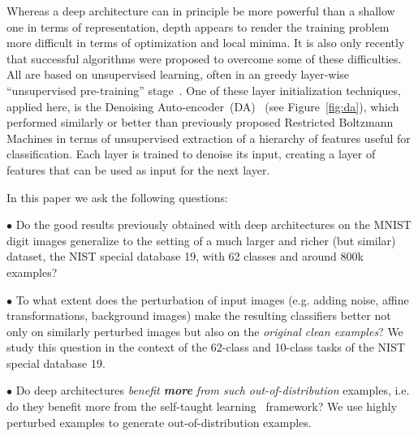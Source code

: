 \documentclass[smallcondensed]{svjour3}     %
\begin{document}
Whereas a deep architecture can in principle be more powerful than a
shallow one in terms of representation, depth appears to render the
training problem more difficult in terms of optimization and local minima.
It is also only recently that successful algorithms were proposed to
overcome some of these difficulties.  All are based on unsupervised
learning, often in an greedy layer-wise ``unsupervised pre-training''
stage~\citep{Bengio-2009}.  One of these layer initialization techniques,
applied here, is the Denoising
Auto-encoder~(DA)~\citep{VincentPLarochelleH2008-very-small} (see Figure~\ref{fig:da}), 
which
performed similarly or better than previously proposed Restricted Boltzmann
Machines in terms of unsupervised extraction of a hierarchy of features
useful for classification. Each layer is trained to denoise its
input, creating a layer of features that can be used as input for the next layer.  


%
In this paper we ask the following questions:

$\bullet$ %
Do the good results previously obtained with deep architectures on the
MNIST digit images generalize to the setting of a much larger and richer (but similar)
dataset, the NIST special database 19, with 62 classes and around 800k examples?

$\bullet$ %
To what extent does the perturbation of input images (e.g. adding
noise, affine transformations, background images) make the resulting
classifiers better not only on similarly perturbed images but also on
the {\em original clean examples}? We study this question in the
context of the 62-class and 10-class tasks of the NIST special database 19.

$\bullet$ %
Do deep architectures {\em benefit {\bf more} from such out-of-distribution}
examples, i.e. do they benefit more from the self-taught learning~\citep{RainaR2007} framework?
We use highly perturbed examples to generate out-of-distribution examples.
\end{document}
